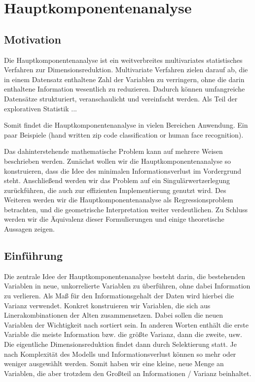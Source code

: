 \chapter{Hauptkomponentenanalyse}

\label{pca}

\section{Motivation}

Die Hauptkomponentenanalyse ist ein weitverbreites multivariates statistisches Verfahren zur Dimensionsreduktion. Multivariate Verfahren zielen darauf ab, die in einem Datensatz enthaltene Zahl der Variablen zu verringern, ohne die darin enthaltene Information wesentlich zu reduzieren. Dadurch können umfangreiche Datensätze strukturiert, veranschaulicht und vereinfacht werden. Als Teil der explorativen Statistik ...

Somit findet die Hauptkomponentenanalyse in vielen Bereichen Anwendung.
Ein paar Beispiele (hand written zip code classification or human face recognition).

Das dahinterstehende mathematische Problem kann auf mehrere Weisen beschrieben werden. Zunächst wollen wir die Hauptkomponentenanalyse so konstruieren, dass die Idee des minimalen Informationsverlust im Vordergrund steht. Anschließend werden wir das Problem auf ein Singulärwertzerlegung zurückführen, die auch zur effizienten Implementierung genutzt wird. Des Weiteren werden wir die Hauptkomponentenanalyse als Regressionsproblem betrachten, und die geometrische Interpretation weiter verdeutlichen. Zu Schluss werden wir die Äquivalenz dieser Formulierungen und einige theoretische Aussagen zeigen.

\section{Einführung}

Die zentrale Idee der Hauptkomponentenanalyse besteht darin, die bestehenden Variablen in neue, unkorrelierte Variablen zu überführen, ohne dabei Information zu verlieren. Als Maß für den Informationsgehalt der Daten wird hierbei die Varianz verwendet. Konkret konstruieren wir Variablen, die sich aus Linerakombinationen der Alten zusammensetzen. Dabei sollen die neuen Variablen der Wichtigkeit nach sortiert sein. In anderen Worten enthält die erste Variable die meiste Information bzw. die größte Varianz, dann die zweite, usw.
Die eigentliche Dimensionsreduktion findet dann durch Selektierung statt. Je nach Komplexität des Modells und Informationsverlust können so mehr oder weniger ausgewählt werden. Somit haben wir eine kleine, neue Menge an Variablen, die aber trotzdem den Großteil an Informationen / Varianz beinhaltet.




